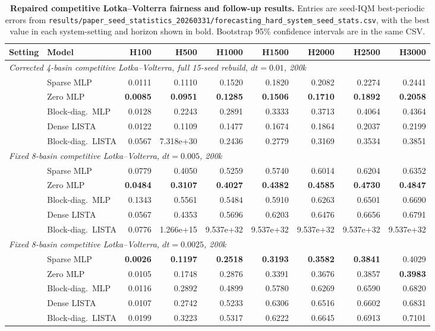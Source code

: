 \begin{table}[ht]
\centering
\scriptsize
\setlength{\tabcolsep}{3.5pt}
\begin{tabular}{p{}p{}rrrrrrr}
\toprule
Setting & Model & H100 & H500 & H1000 & H1500 & H2000 & H2500 & H3000 \\
\midrule
\multicolumn{9}{l}{\textit{Corrected 4-basin competitive Lotka--Volterra, full 15-seed rebuild, $dt=0.01$, 200k}} \\
& Sparse MLP & 0.0111 & 0.1110 & 0.1520 & 0.1820 & 0.2082 & 0.2274 & 0.2441 \\
& Zero MLP & \textbf{0.0085} & \textbf{0.0951} & \textbf{0.1285} & \textbf{0.1506} & \textbf{0.1710} & \textbf{0.1892} & \textbf{0.2058} \\
& Block-diag.\ MLP & 0.0128 & 0.2243 & 0.2891 & 0.3333 & 0.3713 & 0.4064 & 0.4364 \\
& Dense LISTA & 0.0122 & 0.1109 & 0.1477 & 0.1674 & 0.1864 & 0.2037 & 0.2199 \\
& Block-diag.\ LISTA & 0.0567 & 7.318e+30 & 0.2436 & 0.2779 & 0.3169 & 0.3534 & 0.3851 \\
\midrule
\multicolumn{9}{l}{\textit{Fixed 8-basin competitive Lotka--Volterra, $dt=0.005$, 200k}} \\
& Sparse MLP & 0.0779 & 0.4050 & 0.5259 & 0.5740 & 0.6014 & 0.6204 & 0.6352 \\
& Zero MLP & \textbf{0.0484} & \textbf{0.3107} & \textbf{0.4027} & \textbf{0.4382} & \textbf{0.4585} & \textbf{0.4730} & \textbf{0.4847} \\
& Block-diag.\ MLP & 0.1343 & 0.5561 & 0.5484 & 0.5910 & 0.6263 & 0.6501 & 0.6690 \\
& Dense LISTA & 0.0567 & 0.4353 & 0.5696 & 0.6203 & 0.6476 & 0.6656 & 0.6791 \\
& Block-diag.\ LISTA & 0.0776 & 1.266e+15 & 9.537e+32 & 9.537e+32 & 9.537e+32 & 9.537e+32 & 9.537e+32 \\
\midrule
\multicolumn{9}{l}{\textit{Fixed 8-basin competitive Lotka--Volterra, $dt=0.0025$, 200k}} \\
& Sparse MLP & \textbf{0.0026} & \textbf{0.1197} & \textbf{0.2518} & \textbf{0.3193} & \textbf{0.3582} & \textbf{0.3841} & 0.4029 \\
& Zero MLP & 0.0105 & 0.1748 & 0.2876 & 0.3391 & 0.3676 & 0.3857 & \textbf{0.3983} \\
& Block-diag.\ MLP & 0.0116 & 0.2892 & 0.4899 & 0.5780 & 0.6269 & 0.6590 & 0.6820 \\
& Dense LISTA & 0.0107 & 0.2742 & 0.5233 & 0.6306 & 0.6516 & 0.6602 & 0.6831 \\
& Block-diag.\ LISTA & 0.0199 & 0.3223 & 0.5317 & 0.6222 & 0.6645 & 0.6913 & 0.7101 \\
\bottomrule
\end{tabular}
\caption{\textbf{Repaired competitive Lotka--Volterra fairness and follow-up results.} Entries are seed-IQM best-periodic errors from \texttt{results/paper\_seed\_statistics\_20260331/forecasting\_hard\_system\_seed\_stats.csv}, with the best value in each system-setting and horizon shown in bold. Bootstrap 95\% confidence intervals are in the same CSV.}
\label{tab:review-hard-clv-combined-20260314}
\end{table}

